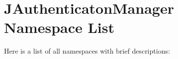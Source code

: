 \section{JAuthenticatonManager Namespace List}
Here is a list of all namespaces with brief descriptions:\begin{CompactList}
\item{}
\end{CompactList}
